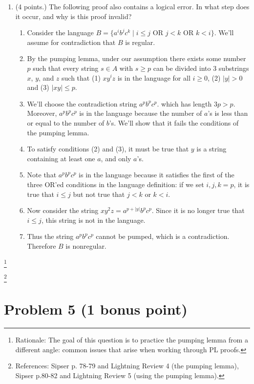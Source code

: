 \documentclass[letterpaper,11pt,twoside]{article}
\theoremstyle{plain}
\theoremstyle{definition}
\theoremstyle{remark}
\theoremstyle{restate}
\newcommand\blfootnote[1]{%
  \begingroup
  \renewcommand\thefootnote{}\footnote{#1}%
  \addtocounter{footnote}{-1}%
  \endgroup
}
\begin{document}
\begin{enumerate}
    \item (4 points.) The following proof also contains a logical error. In what step does it occur, and why is this proof invalid?

    \begin{enumerate}
        \item Consider the language $B = \{a^i b^j c^k \; | \; i \leq j \text{ OR } j < k \text{ OR } k < i\}$. We'll assume for contradiction that $B$ is regular.
        \item By the pumping lemma, under our assumption there exists some number $p$ such that every string $s \in A$ with $s \geq p$ can be divided into 3 substrings $x$, $y$, and $z$ such that (1) $xy^iz$ is in the language for all $i \geq 0$, (2) $|y| > 0$ and (3) $|xy| \leq p$.
        \item We'll choose the contradiction string $a^{p} b^{p} c^{p}$. which has length $3p > p$. Moreover, $a^p b^p c^p$ is in the language because the number of $a$'s is less than or equal to the number of $b$'s. We'll show that it fails the conditions of the pumping lemma.
        \item To satisfy conditions (2) and (3), it must be true that $y$ is a string containing at least one $a$, and only $a$'s.
        \item Note that $a^p b^p c^p$ is in the language because it satisfies the first of the three OR'ed conditions in the language definition: if we set $i, j, k = p$, it is true that $i \leq j$ but not true that $j < k$ or $k < i$.
        \item Now consider the string $x y^2 z = a^{p + |y|} b^p c^p$. Since it is no longer true that $i \leq j$, this string is not in the language.
        \item Thus the string $a^p b^p c^p$ cannot be pumped, which is a contradiction. Therefore $B$ is nonregular.
    \end{enumerate}
\end{enumerate}

\blfootnote{ Rationale: The goal of this question is to practice the pumping lemma from a different angle: common issues that arise when working through PL proofs. }
    \blfootnote{ References: Sipser p. 78-79 and Lightning Review 4 (the pumping lemma), Sipser p.80-82 and Lightning Review 5 (using the pumping lemma).  }


\clearpage
\section{Problem 5 (1 bonus point)}
\end{document}
